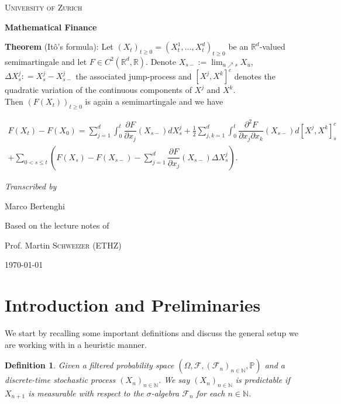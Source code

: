 \documentclass[12pt,a4paper, twoside]{article}
\author{Marco Bertenghi}
\date{}
\newtheorem{defn}{Definition}[section]
\theoremstyle{definition}
\begin{document}
\begin{titlepage}
	\centering
	
	{\scshape\LARGE University of Zurich \par}

	\vspace{1cm}
	{\huge\bfseries Mathematical Finance\par}
		\vspace{2cm}
		\begin{mdframed}[backgroundcolor=blue!20, topline=true, linewidth=2.0pt]
\begin{flushleft}\textbf{Theorem} (Itô's formula): Let $(X_t)_{t \geq 0} = (X_t^1, \dots , X_t^d)_{t \geq 0}$ be an $\mathbb{R}^d$-valued semimartingale and let $F \in C^2 ( \mathbb{R}^d, \mathbb{R})$.  Denote $X_{s-}:= \lim_{u \nearrow s} X_u$, $\Delta X_s^j: = X_s^j-X_{s-}^j$ the associated jump-process and $[ X^j, X^k]^c$ denotes the quadratic variation of the continuous components of $X^j$ and $X^k$. \\ Then $(F(X_t))_{t \geq 0}$ is again a semimartingale and we have
\end{flushleft}
\begin{align*}
F(X_t)-F(X_0)= \sum_{j=1}^d \int_0^t \dfrac{\partial F}{\partial x_j} (X_{s-}) dX_s^j + \frac{1}{2} \sum_{j,k=1}^d \int_0^t \dfrac{\partial^2  F}{\partial x_j \partial x_k}(X_{s-}) d [ X^j, X^k ]_s^c \\
+ \sum_{0 < s \leq t} \left( F(X_s)-F(X_{s-}) - \sum_{j=1}^d \dfrac{\partial F}{\partial x_j} (X_{s-}) \Delta X_s^j \right). 
\end{align*}
\end{mdframed}
\par\vspace{1cm}
	\vspace{2cm}
	{\Large\itshape Transcribed by \par Marco Bertenghi\par}
	\vfill
	Based on the lecture notes of \par
	Prof. Martin \textsc{Schweizer} (ETHZ)

	\vfill

	{\large \today\par}
\end{titlepage}
\newpage
\tableofcontents
\newpage
\section{Introduction and Preliminaries}
We start by recalling some important definitions and discuss the general setup we are working with in a heuristic manner. 
\begin{defn} Given a filtered probability space $(\Omega, \mathcal{F}, ( \mathcal{F}_n)_{n \in \mathbb{N}}, \mathbb{P})$ and a discrete-time stochastic process $(X_n)_{n \in \mathbb{N}}$. We say $(X_n)_{n \in \mathbb{N}}$ is predictable if $X_{n+1}$ is measurable with respect to the $\sigma$-algebra $\mathcal{F}_n$ for each $n \in \mathbb{N}$. 
\end{defn}
\end{document}
